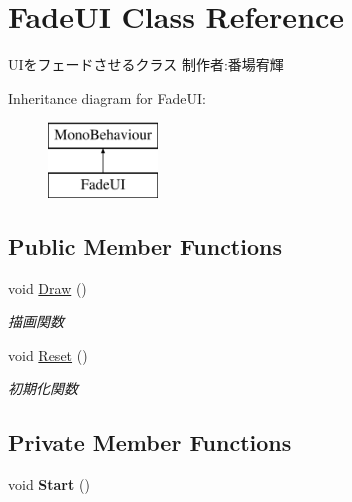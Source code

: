 \hypertarget{class_fade_u_i}{}\section{Fade\+UI Class Reference}
\label{class_fade_u_i}


U\+Iをフェードさせるクラス 制作者\+:番場宥輝  


Inheritance diagram for Fade\+UI\+:\begin{figure}[H]
\begin{center}
\leavevmode
\includegraphics[height=2.000000cm]{class_fade_u_i}
\end{center}
\end{figure}
\subsection*{Public Member Functions}
\begin{DoxyCompactItemize}
\item 
void \hyperlink{class_fade_u_i_a9e2c69e9145c0fa0321070a7ad92222b}{Draw} ()
\begin{DoxyCompactList}\small\item\em 描画関数 \end{DoxyCompactList}\item 
void \hyperlink{class_fade_u_i_ad501c58fdd749daf61d6e48f0ccb20a9}{Reset} ()
\begin{DoxyCompactList}\small\item\em 初期化関数 \end{DoxyCompactList}\end{DoxyCompactItemize}
\subsection*{Private Member Functions}
\begin{DoxyCompactItemize}
\item 
\mbox{\label{class_fade_u_i_a56d69facfcc33e08de9ac90d355b4725}} 
void {\bfseries Start} ()
\end{DoxyCompactItemize}
